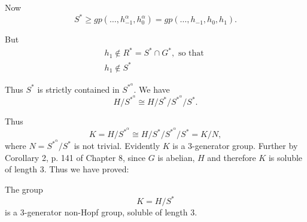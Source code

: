 Now 
$$
S^* \geq gp(\ldots, h^{\alpha}_{-1},h^{\alpha}_{0}) = gp (\ldots,
h_{-1}, h_0, h_1). 
$$

But
\begin{gather*}
  h_1 \notin R^* = S^* \cap G^*, \text{ so that }\\
  h_1 \notin S^*
\end{gather*}

Thus $S^*$ is strictly contained in $S^{*^{\alpha}}$. We have 
$$
H/S^{*^{\alpha}} \cong H/S^*/S^{*^{\alpha}}/S^*.
$$

Thus
$$
K = H/S^{*^{\alpha}} \cong H/S^*/S^{*^{\alpha}}/S^* = K/N,
$$
where $N = S^{*^{\alpha}}/S^*$ is not trivial. Evidently $K$ is a
3-generator group. Further by Corollary 2, p. 141 of Chapter 8, since
$G$ is abelian, $H$ and therefore $K$ is soluble of length 3. Thus we
have proved: 
\begin{Theorem}%
  The group
  $$
  K= H/ S^*
  $$
  is a 3-generator non-Hopf group, soluble of length 3.
\end{Theorem}

